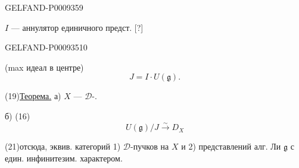 \begin{GelfandAdjacentEvidence}{GELFAND-P000935}{9}


$I$ --- аннулятор единичного предст. [?]
\end{GelfandAdjacentEvidence}
\begin{GelfandAdjacentEvidence}{GELFAND-P000935}{10}


(max идеал в центре)
\begin{equation*}
 J=I\cdot U(\mathfrak g).
 \tag{18}
\end{equation*}

(19)\quad \underline{Теорема.} а) $X$ --- $\mathcal D$-.

б)\enspace {} (16) 
\begin{equation*}
 U(\mathfrak g)/J\overset{\sim}{\longrightarrow}D_X
 \tag{20}
\end{equation*}
\end{GelfandAdjacentEvidence}


(21)\quad отсюда, эквив. категорий 1) $\mathcal D$-пучков на $X$ и 2) представлений алг. Ли $\mathfrak g$ с един. инфинитезим. характером.

